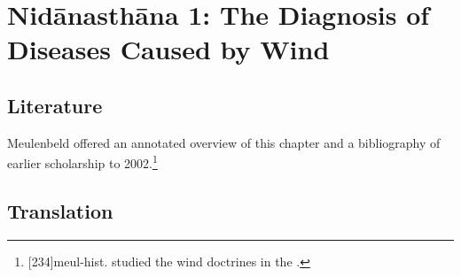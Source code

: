 
\chapter{Nidānasthāna 1: The Diagnosis of Diseases Caused 
by Wind}


\section{Literature}

Meulenbeld offered an annotated overview of this chapter and a
bibliography of earlier scholarship to 
2002.\footnote{[234]{meul-hist}. \citep{rube-1954b} studied the 
wind doctrines in the \CS.}


\section{Translation}

